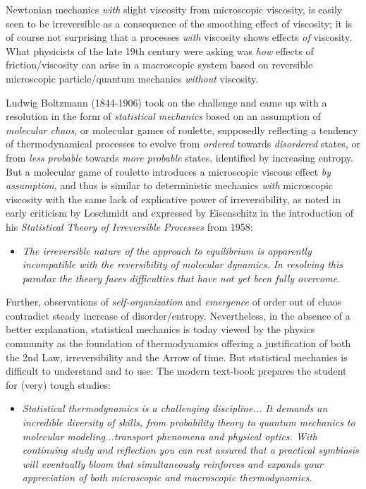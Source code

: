 Newtonian mechanics \emph{with} slight viscosity 
from microscopic viscosity, is easily seen to be irreversible 
as a consequence of the smoothing effect of viscosity;  
it is of course not surprising that a processes \emph{with} viscosity 
shows effects \emph{of} viscosity. What physicists of the 
late 19th century were asking was 
\emph{how} effects of friction/viscosity can
arise in a macroscopic system based on reversible microscopic
particle/quantum mechanics \emph{without} viscosity.
  
Ludwig Boltzmann (1844-1906) took on the challenge and came up with
a resolution in the  form of \emph{statistical mechanics} based on 
an assumption of \emph{molecular chaos}, or molecular games of roulette, 
supposedly reflecting a tendency of thermodynamical processes
to evolve from \emph{ordered} towards \emph{disordered} states, 
or from \emph{less probable} towards \emph{more probable} states, 
identified by increasing entropy.
But a molecular game of roulette introduces a microscopic viscous effect 
\emph{by assumption}, and thus is similar to deterministic
mechanics \emph{with} microscopic viscosity with the same lack of 
explicative power of irreversibility, as noted in early criticism by Loschmidt
\cite{loschmidt} and expressed by Eisenschitz in the introduction of his 
\emph{Statistical Theory of Irreversible Processes} from 1958:
\begin{itemize}
\item \emph{The irreversible nature of the approach to
equilibrium is apparently incompatible with the reversibility
of molecular dynamics. In resolving this paradox the theory
faces difficulties that have not yet been fully overcome}.
\end{itemize} 
Further, observations of \emph{self-organization} and \emph{emergence} 
of order out of chaos contradict steady
increase of disorder/entropy. 
Nevertheless, in the absence of a better explanation,
statistical mechanics is today viewed by the physics community as the 
foundation of thermodynamics offering a justification 
of both the 2nd Law, irreversibility 
and the Arrow of time. But statistical mechanics is difficult 
to understand
and to use: The modern text-book \cite{laurendau} 
prepares the student for (very) tough studies:
\begin{itemize}
\item \emph{Statistical thermodynamics is a challenging discipline...
It demands an incredible diversity of skills, from probability theory
to quantum mechanics to molecular modeling...transport phenomena
and physical optics. With continuing study
and reflection you can rest assured that a practical symbiosis will
eventually bloom that simultaneously reinforces and expands your
appreciation of both microscopic and macroscopic thermodynamics}.
\end{itemize}
   

